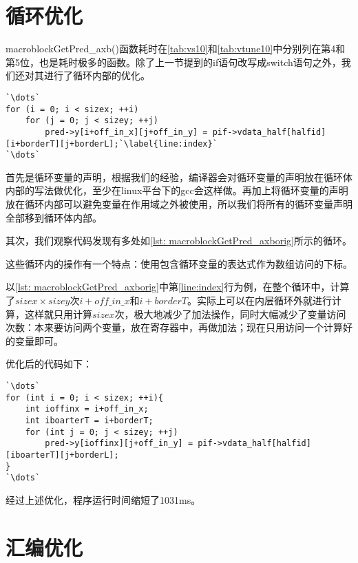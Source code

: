 \section{循环优化}
\label{sec:singlecoreloopopt}

macroblockGetPred\_axb()函数耗时在\autoref{tab:vs10}和\autoref{tab:vtune10}中分别列在第4和第5位，也是耗时极多的函数。除了上一节提到的if语句改写成switch语句之外，我们还对其进行了循环内部的优化。
\begin{lstlisting}[caption = {macroblockGetPred\_axb()函数片段（优化前）}, label = lst: macroblockGetPred_axborig]
`\dots`
for (i = 0; i < sizex; ++i)
	for (j = 0; j < sizey; ++j)
		pred->y[i+off_in_x][j+off_in_y] = pif->vdata_half[halfid][i+borderT][j+borderL];`\label{line:index}`
`\dots`
\end{lstlisting}

首先是循环变量的声明，根据我们的经验，编译器会对循环变量的声明放在循环体内部的写法做优化，至少在linux平台下的gcc会这样做。再加上将循环变量的声明放在循环内部可以避免变量在作用域之外被使用，所以我们将所有的循环变量声明全部移到循环体内部。

其次，我们观察代码发现有多处如\autoref{lst: macroblockGetPred_axborig}所示的循环。


这些循环内的操作有一个特点：使用包含循环变量的表达式作为数组访问的下标。

以\autoref{lst: macroblockGetPred_axborig}中第\ref{line:index}行为例，在整个循环中，计算了$sizex\times sizey$次$i+off\_in\_x$和$i+borderT$。实际上可以在内层循环外就进行计算，这样就只用计算$sizex$次，极大地减少了加法操作，同时大幅减少了变量访问次数：本来要访问两个变量，放在寄存器中，再做加法；现在只用访问一个计算好的变量即可。

优化后的代码如下：
\begin{lstlisting}[caption = {macroblockGetPred\_axb()函数片段（优化后）}, label = lst: macroblockGetPred_axbopt]
`\dots`
for (int i = 0; i < sizex; ++i){
	int ioffinx = i+off_in_x;
	int iboarterT = i+borderT;
	for (int j = 0; j < sizey; ++j)
		pred->y[ioffinx][j+off_in_y] = pif->vdata_half[halfid][iboarterT][j+borderL];
}
`\dots`
\end{lstlisting}

经过上述优化，程序运行时间缩短了1031ms。


\section{汇编优化}
\label{sec:singlecoreasmopt}

